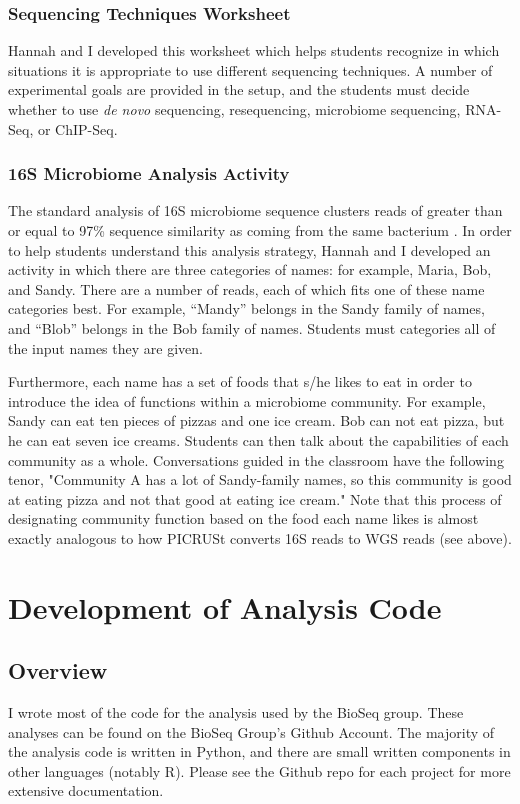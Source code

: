 \documentclass{report}
\begin{document}
\subsection{Sequencing Techniques Worksheet}
Hannah and I developed this worksheet which helps students recognize in which situations it is appropriate to use different sequencing techniques. A number of experimental goals are provided in the setup, and the students must decide whether to use \emph{de novo} sequencing, resequencing, microbiome sequencing, RNA-Seq, or ChIP-Seq.

\subsection{16S Microbiome Analysis Activity}
The standard analysis of 16S microbiome sequence clusters reads of greater than or equal to 97\% sequence similarity as coming from the same bacterium \cite{glockner2000comparative}. In order to help students understand this analysis strategy, Hannah and I developed an activity in which there are three categories of names: for example, Maria, Bob, and Sandy. There are a number of reads, each of which fits one of these name categories best. For example, ``Mandy'' belongs in the Sandy family of names, and ``Blob'' belongs in the Bob family of names. Students must categories all of the input names they are given.

Furthermore, each name has a set of foods that s/he likes to eat in order to introduce the idea of functions within a microbiome community. For example, Sandy can eat ten pieces of pizzas and one ice cream. Bob can not eat pizza, but he can eat seven ice creams. Students can then talk about the capabilities of each community as a whole. Conversations guided in the classroom have the following tenor, "Community A has a lot of Sandy-family names, so this community is good at eating pizza and not that good at eating ice cream." Note that this process of designating community function based on the food each name likes is almost exactly analogous to how PICRUSt converts 16S reads to WGS reads (see above).


\chapter{Development of Analysis Code}
\section{Overview}
I wrote most of the code for the analysis used by the BioSeq group. These analyses can be found on the BioSeq Group's Github Account. The majority of the analysis code is written in Python, and there are small written components in other languages (notably R). Please see the Github repo for each project for more extensive documentation.
\end{document}
